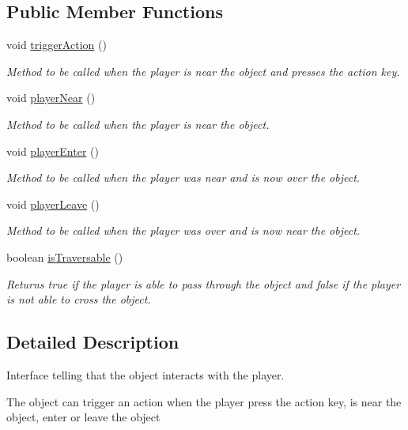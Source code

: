 \subsection*{Public Member Functions}
\begin{DoxyCompactItemize}
\item 
void \hyperlink{a00014_a841a0e3dba2416de9a7d12c73725ec0d}{trigger\-Action} ()
\begin{DoxyCompactList}\small\item\em Method to be called when the player is near the object and presses the action key. \end{DoxyCompactList}\item 
void \hyperlink{a00014_a8cebf64b8b0823be212f7c0a0a29d044}{player\-Near} ()
\begin{DoxyCompactList}\small\item\em Method to be called when the player is near the object. \end{DoxyCompactList}\item 
void \hyperlink{a00014_ab3cca356bc5980e1a229e2f3f954237a}{player\-Enter} ()
\begin{DoxyCompactList}\small\item\em Method to be called when the player was near and is now over the object. \end{DoxyCompactList}\item 
void \hyperlink{a00014_acf8ca40042c26ee08bf2cba15e12ae59}{player\-Leave} ()
\begin{DoxyCompactList}\small\item\em Method to be called when the player was over and is now near the object. \end{DoxyCompactList}\item 
boolean \hyperlink{a00014_aa1066b03a82447c77ac45bd29a2d051a}{is\-Traversable} ()
\begin{DoxyCompactList}\small\item\em Returns true if the player is able to pass through the object and false if the player is not able to cross the object. \end{DoxyCompactList}\end{DoxyCompactItemize}


\subsection{Detailed Description}
Interface telling that the object interacts with the player. 

The object can trigger an action when the player press the action key, is near the object, enter or leave the object 

